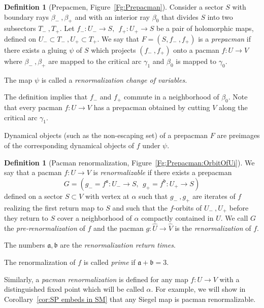 \documentclass[]{amsart}
\renewcommand{\sp}{{\ \ }}
\renewcommand{\aa}{{\mathfrak{a}}}
\newcommand{\bb}{{\mathfrak{b}}}
\theoremstyle{remark}
\numberwithin{equation}{section}
\theoremstyle{definition}
\newtheorem{defn}[thm]{Definition}
\begin{document}

\begin{defn}[Prepacmen, Figure~\ref{Fg:Prepacman}]
\label{defn:Prepacmen} Consider a sector $S$ with boundary rays $\beta_-~, \beta_+$ and with an interior ray $\beta_0$ that divides $S$ into two subsectors $T_-~, T_+$.  Let $f_- \colon U_- \to S,\sp f_+ \colon U_+ \to S$ be a pair of holomorphic maps, defined on $U_- \subset T_-~,U_+ \subset T_+$. We say that $F=(S,f_-~,f_+)$ is a \emph{prepacman} if there exists a gluing $\psi$ of $S$ which projects $(f_-~,f_+)$ onto a pacman $f\colon U \to V$ where $\beta_-~, \beta_+$ are mapped to the critical arc $\gamma_1$ and $\beta_0$ is mapped to $\gamma_0$. 

The map $\psi$ is called a \emph{renormalization change of variables.}
\end{defn}
The definition implies that $f_-$ and $f_+$ commute in a neighborhood of $\beta_0$. Note that every pacman  $f\colon U\to  V$ has a prepacman obtained by cutting $V$ along the critical arc $\gamma_1$.

Dynamical objects (such as the non-escaping set) of a prepacman $F$ are preimages of the corresponding dynamical objects of $f$ under $\psi$. 



\begin{defn}[Pacman renormalization, Figure~\ref{Fg:Prepacman:OrbitOfUi}]
\label{den:PacmRenorm} We say that a pacman ${f\colon U\to   V}$ is \emph{renormalizable} if there exists a prepacman \[G=(g_-=f^\aa \colon U_-\to S,\sp g_+=f^\bb \colon U_+\to S)\] defined on a sector  $S \subset V$ with vertex at $\alpha$  such that $g_-~, g_+$ are iterates of $f$ realizing the first return map to $S$ and such that the $f$-orbits of $U_-~,U_+$ before they return to $S$ cover a neighborhood of $\alpha$ compactly contained in $U$. We call $G$ the \emph{pre-renormalization} of $f$ and the pacman $g\colon \widehat{U}\to   \widehat{V} $ is the \emph{renormalization} of $f$.

The numbers $\aa,\bb$ are the \emph{renormalization return times}.

The renormalization of $f$ is called \emph{prime} if $\aa+\bb=3$. 
\end{defn}
\noindent Similarly, a \emph{pacman renormalization} is defined for any map $f\colon U\to V$ with a distinguished fixed point which will be called $\alpha$. For example, we will show in Corollary~\ref{cor:SP embeds in SM} that any Siegel map is pacman renormalizable. 
\end{document}
